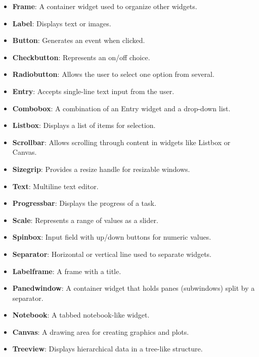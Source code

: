 \begin{itemize}
    \item \textbf{Frame}: A container widget used to organize other widgets.
    
    \item \textbf{Label}: Displays text or images.
    
    \item \textbf{Button}: Generates an event when clicked.
    
    \item \textbf{Checkbutton}: Represents an on/off choice.
    
    \item \textbf{Radiobutton}: Allows the user to select one option from several.
    
    \item \textbf{Entry}: Accepts single-line text input from the user.
    
    \item \textbf{Combobox}: A combination of an Entry widget and a drop-down list.
    
    \item \textbf{Listbox}: Displays a list of items for selection.
    
    \item \textbf{Scrollbar}: Allows scrolling through content in widgets like Listbox or Canvas.
    
    \item \textbf{Sizegrip}: Provides a resize handle for resizable windows.
    
    \item \textbf{Text}: Multiline text editor.
    
    \item \textbf{Progressbar}: Displays the progress of a task.
    
    \item \textbf{Scale}: Represents a range of values as a slider.
    
    \item \textbf{Spinbox}: Input field with up/down buttons for numeric values.
    
    \item \textbf{Separator}: Horizontal or vertical line used to separate widgets.
    
    \item \textbf{Labelframe}: A frame with a title.
    
    \item \textbf{Panedwindow}: A container widget that holds panes (subwindows) split by a separator.
    
    \item \textbf{Notebook}: A tabbed notebook-like widget.
    
    \item \textbf{Canvas}: A drawing area for creating graphics and plots.
    
    \item \textbf{Treeview}: Displays hierarchical data in a tree-like structure.
\end{itemize}

